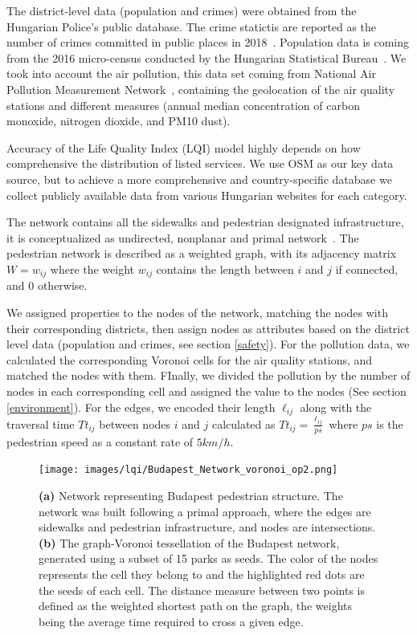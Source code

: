 The district-level data (population and crimes) were obtained from the Hungarian Police's public database. The crime statictis are reported as the  number of crimes committed in public places in 2018~\cite{HU2019Police}. Population data is coming from the 2016 micro-census conducted by the Hungarian Statistical Bureau~\cite{HU2016Population}. We took into account the air pollution, this data set coming from National Air Pollution Measurement Network~\cite{HU2019Pollution}, containing the geolocation of the air quality stations and different measures (annual median concentration of carbon monoxide, nitrogen dioxide, and PM10 dust).

Accuracy of the Life Quality Index (LQI) model highly depends on how comprehensive the distribution of listed services. We use OSM as our key data source, but to achieve a more comprehensive and country-specific database we collect publicly available data from various Hungarian websites for each category. %

The network contains all the sidewalks and pedestrian designated infrastructure, it is conceptualized as undirected, nonplanar and primal network~\cite{porta2006primal}. The pedestrian network is described as a weighted graph, with its adjacency matrix $W=w_{ij}$ where the weight $w_{ij}$ contains the length between $i$ and $j$ if connected, and $0$ otherwise.

We assigned properties to the nodes of the network, matching the nodes with their corresponding districts, then assign nodes as attributes based on the district level data (population and crimes, see section \ref{safety}). For the pollution data, we calculated the corresponding Voronoi cells for the air quality stations, and matched the nodes with them. FInally, we divided the pollution by the number of nodes in each corresponding cell and assigned the value to the nodes (See section \ref{environment}). For the edges, we encoded their length $\ell_{ij}$ along with the traversal time $Tt_{ij}$ between nodes $i$ and $j$ calculated as $Tt_{ij}=\frac{\ell_{ij}}{ps}$ where $ps$ is the pedestrian speed as a constant rate of $5km/h$.

\begin{figure}[htbp]
	\centering
	\texttt{[image: images/lqi/Budapest\_Network\_voronoi\_op2.png]}
	\caption[Budapest pedestrian network]{\textbf{(a)} Network representing Budapest pedestrian structure. The network was built following a primal approach, where the edges are sidewalks and pedestrian infrastructure, and nodes are intersections. \textbf{(b)} The graph-Voronoi tessellation of the Budapest network, generated using a subset of 15 parks as seeds. The color of the nodes represents the cell they belong to and the highlighted red dots are the seeds of each cell. The distance measure between two points is defined as the weighted shortest path on the graph, the weights being the average time required to cross a given edge.}
	\label{fig:BPnetwork}
\end{figure}

